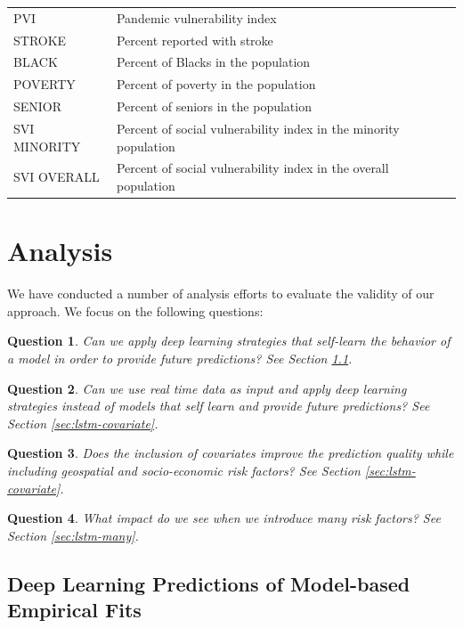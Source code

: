 \documentclass[letterpaper, inpress]{jds} %
\renewcommand{\_}{%
    \textunderscore\hspace{0pt}%
}
\newtheorem{question}{Question}
\begin{document}
\begin{table}[!hptb]
{\begin{tabular}{ll}
 PVI 		  & Pandemic vulnerability index \\
 STROKE 	  & Percent reported with stroke\\
 BLACK	  & Percent of Blacks in the population\\
 POVERTY & Percent of poverty in the population\\
 SENIOR  & Percent of seniors in the population\\
 SVI\_MINORITY 	  & Percent of social vulnerability index in the minority population\\
 SVI\_OVERALL 	  & Percent of social vulnerability index in the overall population\\
\bottomrule
\end{tabular}
}
\end{table}


\section{Analysis}

We have conducted a number of analysis efforts to evaluate the validity of our approach. We focus on the following questions:

\begin{question} Can we apply deep learning strategies that self-learn the behavior of a model in order to provide future predictions? See Section \ref{sec:emperical}.
\label{q:1}
\end{question}

\begin{question} Can we use real time data as input and apply deep learning strategies instead of models that self learn and provide future predictions? See Section \ref{sec:lstm-covariate}.
\label{q:2}
\end{question}

\begin{question} Does the inclusion of covariates improve the prediction quality while including geospatial and socio-economic risk factors? See Section \ref{sec:lstm-covariate}.
\label{q:3}
\end{question}

\begin{question} What impact do we see when we introduce many risk factors? See Section \ref{sec:lstm-many}.
\label{q:4}
\end{question}




\subsection{Deep Learning Predictions of Model-based Empirical Fits} 
\label{sec:emperical}
\end{document}
